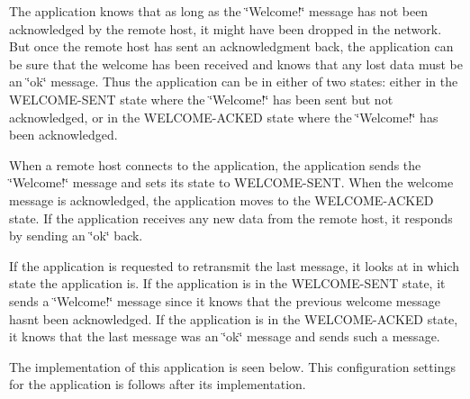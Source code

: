 The application knows that as long as the \char`\"{}\+Welcome!\char`\"{} message has not been acknowledged by the remote host, it might have been dropped in the network. But once the remote host has sent an acknowledgment back, the application can be sure that the welcome has been received and knows that any lost data must be an \char`\"{}ok\char`\"{} message. Thus the application can be in either of two states\+: either in the W\+E\+L\+C\+O\+M\+E-\/\+S\+E\+NT state where the \char`\"{}\+Welcome!\char`\"{} has been sent but not acknowledged, or in the W\+E\+L\+C\+O\+M\+E-\/\+A\+C\+K\+ED state where the \char`\"{}\+Welcome!\char`\"{} has been acknowledged.

When a remote host connects to the application, the application sends the \char`\"{}\+Welcome!\char`\"{} message and sets it\textquotesingle{}s state to W\+E\+L\+C\+O\+M\+E-\/\+S\+E\+NT. When the welcome message is acknowledged, the application moves to the W\+E\+L\+C\+O\+M\+E-\/\+A\+C\+K\+ED state. If the application receives any new data from the remote host, it responds by sending an \char`\"{}ok\char`\"{} back.

If the application is requested to retransmit the last message, it looks at in which state the application is. If the application is in the W\+E\+L\+C\+O\+M\+E-\/\+S\+E\+NT state, it sends a \char`\"{}\+Welcome!\char`\"{} message since it knows that the previous welcome message hasn\textquotesingle{}t been acknowledged. If the application is in the W\+E\+L\+C\+O\+M\+E-\/\+A\+C\+K\+ED state, it knows that the last message was an \char`\"{}ok\char`\"{} message and sends such a message.

The implementation of this application is seen below. This configuration settings for the application is follows after its implementation.



